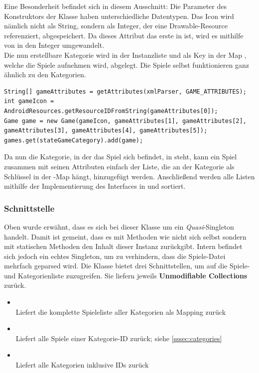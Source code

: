 Eine Besonderheit befindet sich in diesem Ausschnitt: Die Parameter des
Konstruktors der Klasse haben unterschiedliche Datentypen. Das Icon wird nämlich
nicht als String, sondern als Integer, der eine Drawable-Resource referenziert,
abgespeichert. Da dieses Attribut das erste in  ist,
wird es mithilfe von  in den Integer umgewandelt.\\ Die
nun erstellbare Kategorie wird in der Instanzliste  und als Key
in der Map , welche die Spiele aufnehmen wird, abgelegt. Die Spiele
selbst funktionieren ganz ähnlich zu den Kategorien.

\begin{lstlisting} 
String[] gameAttributes = getAttributes(xmlParser, GAME_ATTRIBUTES);
int gameIcon = AndroidResources.getResourceIDFromString(gameAttributes[0]);
Game game = new Game(gameIcon, gameAttributes[1], gameAttributes[2], gameAttributes[3], gameAttributes[4], gameAttributes[5]);
games.get(stateGameCategory).add(game);
\end{lstlisting}

Da nun die Kategorie, in der das Spiel sich befindet, in
 steht, kann ein Spiel zusammen mit seinen Attributen
einfach der Liste, die an der Kategorie als Schlüssel in der -Map
hängt, hinzugefügt werden. Anschließend werden alle Listen mithilfe der
Implementierung des Interfaces  in  und
 sortiert.

\subsubsection{Schnittstelle}

Oben wurde erwähnt, dass es sich bei dieser Klasse um ein \emph{Quasi}-Singleton
handelt. Damit ist gemeint, dass es mit Methoden wie  nicht
sich selbst sondern mit statischen Methoden den Inhalt dieser Instanz
zurückgibt. Intern befindet sich jedoch ein echtes Singleton, um zu verhindern,
dass die Spiele-Datei mehrfach geparsed wird. Die Klasse bietet drei
Schnittstellen, um auf die Spiele- und Kategorienliste zuzugreifen. Sie liefern
jeweils \textbf{Unmodifiable Collections} zurück.

\begin{itemize}
\item {}\\
Liefert die komplette Spieleliste aller Kategorien als Mapping zurück
\item {}\\
Liefert alle Spiele einer Kategorie-ID zurück; siehe \autoref{sssec:categories}
\item {}\\
Liefert alle Kategorien inklusive IDs zurück
\end{itemize}

